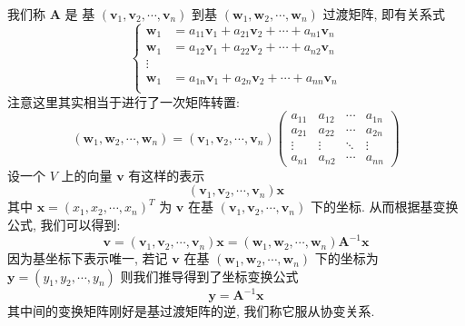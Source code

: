 \documentclass[UTF8]{book}
\begin{document}
我们称 $\boldsymbol{A}$ 是 
基  $(\boldsymbol{v}_1,\boldsymbol{v}_2,\cdots,\boldsymbol{v}_n)$ 
到基 $(\boldsymbol{w}_1,\boldsymbol{w}_2,\cdots,\boldsymbol{w}_n)$ 
过渡矩阵, 
即有关系式
\begin{equation}
    \begin{cases}
        \boldsymbol{w}_1 &= a_{11}\boldsymbol{v}_1 + a_{21}\boldsymbol{v}_2 
        + \cdots + a_{n1}\boldsymbol{v}_n \\
        \boldsymbol{w}_1 &= a_{12}\boldsymbol{v}_1 + a_{22}\boldsymbol{v}_2 
        + \cdots + a_{n2}\boldsymbol{v}_n \\
        \vdots \\
        \boldsymbol{w}_1 &= a_{1n}\boldsymbol{v}_1 + a_{2n}\boldsymbol{v}_2 
        + \cdots + a_{nn}\boldsymbol{v}_n \\
    \end{cases}
\end{equation}
注意这里其实相当于进行了一次矩阵转置: 
\begin{equation}
    (\boldsymbol{w}_1,\boldsymbol{w}_2,\cdots,\boldsymbol{w}_n) = 
    (\boldsymbol{v}_1,\boldsymbol{v}_2,\cdots,\boldsymbol{v}_n)
    \begin{pmatrix}
    a_{11} & a_{12} & \cdots & a_{1n} \\
    a_{21} & a_{22} & \cdots & a_{2n} \\
    \vdots & \vdots & \ddots & \vdots  \\
    a_{n1} & a_{n2} & \cdots & a_{nn} 
\end{pmatrix}
\end{equation}
设一个 $V$ 上的向量 $\boldsymbol{v}$ 有这样的表示 
$$
(\boldsymbol{v}_1,\boldsymbol{v}_2,\cdots,\boldsymbol{v}_n) \boldsymbol{x}
$$
其中 $\boldsymbol{x}=(x_1,x_2,\cdots,x_n)^T$ 为 $\boldsymbol{v}$ 
在基 $(\boldsymbol{v}_1,\boldsymbol{v}_2,\cdots,\boldsymbol{v}_n)$ 
下的坐标. 
从而根据基变换公式, 我们可以得到: 
\begin{equation}
    \boldsymbol{v}= 
    (\boldsymbol{v}_1,\boldsymbol{v}_2,\cdots,\boldsymbol{v}_n)
    \boldsymbol{x}
    = (\boldsymbol{w}_1,\boldsymbol{w}_2,\cdots,\boldsymbol{w}_n) 
    \boldsymbol{A}^{-1}\boldsymbol{x}
\end{equation}
因为基坐标下表示唯一, 若记 $\boldsymbol{v}$ 
在基 $(\boldsymbol{w}_1,\boldsymbol{w}_2,\cdots,\boldsymbol{w}_n)$ 
下的坐标为 $\boldsymbol{y}=(y_1,y_2,\cdots,y_n)$ 
则我们推导得到了坐标变换公式
$$\boldsymbol{y}=\boldsymbol{A}^{-1}\boldsymbol{x}$$ 
其中间的变换矩阵刚好是基过渡矩阵的逆, 
我们称它服从协变关系. 
\end{document}
